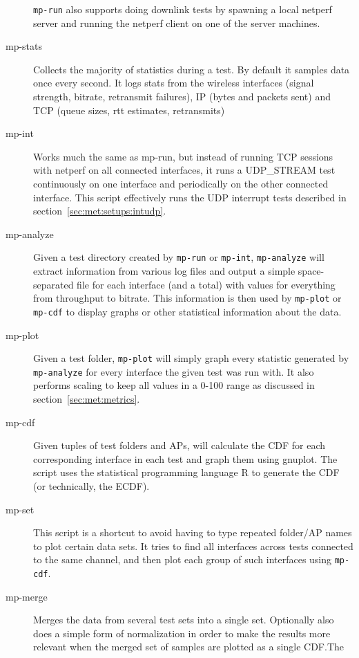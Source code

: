 \begin{description}
    \texttt{mp-run} also supports doing downlink tests by spawning a local
    netperf server and running the netperf client on one of the server machines.
  \item[mp-stats]
    Collects the majority of statistics during a test. By default it samples
    data once every second. It logs stats from the wireless interfaces (signal
    strength, bitrate, retransmit failures), IP (bytes and packets sent) and TCP
    (queue sizes, rtt estimates, retransmits)
  \item[mp-int]
    Works much the same as mp-run, but instead of running TCP sessions with
    netperf on all connected interfaces, it runs a UDP\_STREAM test continuously
    on one interface and periodically on the other connected interface. This
    script effectively runs the UDP interrupt tests described in
    section~\ref{sec:met:setups:intudp}.
  \item[mp-analyze]
    Given a test directory created by \texttt{mp-run} or \texttt{mp-int},
    \texttt{mp-analyze} will extract information from various log files and
    output a simple space-separated file for each interface (and a total) with
    values for everything from throughput to bitrate. This information is then
    used by \texttt{mp-plot} or \texttt{mp-cdf} to display graphs or other
    statistical information about the data.
  \item[mp-plot]
    Given a test folder, \texttt{mp-plot} will simply graph every statistic
    generated by \texttt{mp-analyze} for every interface the given test was run
    with. It also performs scaling to keep all values in a 0-100 range as
    discussed in section~\ref{sec:met:metrics}.
  \item[mp-cdf]
    Given tuples of test folders and APs, will calculate the CDF for each
    corresponding interface in each test and graph them using gnuplot. The
    script uses the statistical programming language R to generate the CDF (or
    technically, the ECDF).
  \item[mp-set]
    This script is a shortcut to avoid having to type repeated folder/AP
    names to plot certain data sets. It tries to find all interfaces across
    tests connected to the same channel, and then plot each group of such
    interfaces using \texttt{mp-cdf}.
  \item[mp-merge]
    Merges the data from several test sets into a single set. Optionally also
    does a simple form of normalization in order to make the results more
    relevant when the merged set of samples are plotted as a single CDF.\@ The

\end{description}
